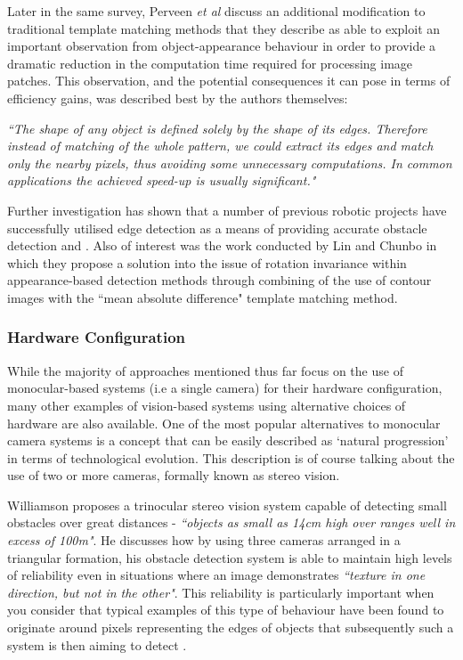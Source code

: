 Later in the same survey, Perveen \textit{et al} discuss an additional modification to traditional template matching methods that they describe as able to exploit an important observation from object-appearance behaviour in order to provide a dramatic reduction in the computation time required for processing image patches. This observation, and the potential consequences it can pose in terms of efficiency gains, was described best by the authors themselves:

\indent \textit{``The shape of any object is defined solely by the shape of its edges. Therefore instead of matching of the whole pattern, we could extract its edges and match only the nearby pixels, thus avoiding some unnecessary computations. In common applications the achieved speed-up is usually significant."} \cite{perveen}

Further investigation has shown that a number of previous robotic projects have successfully utilised edge detection as a means of providing accurate obstacle detection \cite{hanumante} and \cite{borenstein}. Also of interest was the work conducted by Lin and Chunbo \cite{lin} in which they propose a solution into the issue of rotation invariance within appearance-based detection methods through combining of the use of contour images with the ``mean absolute difference" template matching method. 

\subsubsection{Hardware Configuration}
 
While the majority of approaches mentioned thus far focus on the use of monocular-based systems (i.e a single camera) for their hardware configuration, many other examples of vision-based systems using alternative choices of hardware are also available. One of the most popular alternatives to monocular camera systems is a concept that can be easily described as `natural progression' in terms of technological evolution. This description is of course talking about the use of two or more cameras, formally known as stereo vision. 

Williamson \cite{williamson} proposes a trinocular stereo vision system capable of detecting small obstacles over great distances - \textit{``objects as small as 14cm high over ranges well in excess of 100m"}. He discusses how by using three cameras arranged in a triangular formation, his obstacle detection system is able to maintain high levels of reliability even in situations where an image demonstrates \textit{``texture in one direction, but not in the other"}. This reliability is particularly important when you consider that typical examples of this type of behaviour have been found to originate around pixels representing the edges of objects that subsequently such a system is then aiming to detect \cite{williamson}. 

